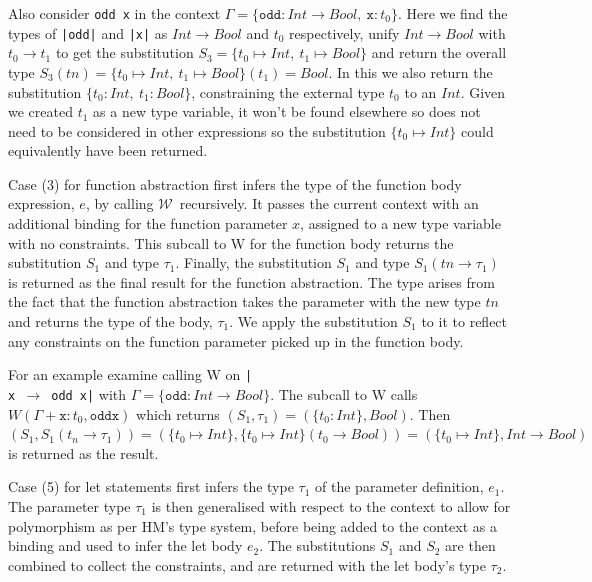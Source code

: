 \documentclass[a4paper,fleqn,oneside,12pt]{report}
\newcommand{\W}{$\mathcal{W}$}
\begin{document}
Also consider \texttt{odd x} in the context $\Gamma = \{ \mathtt{odd} : Int \rightarrow Bool,\ \mathtt{x} : t_0 \}$. Here we find the types of \texttt{|odd|} and \texttt{|x|} as $Int \rightarrow Bool$ and $t_0$ respectively, unify $Int \rightarrow Bool$ with $t_0 \rightarrow t_1$ to get the substitution $S_3 = \{ t_0 \mapsto Int,\ t_1 \mapsto Bool \}$ and return the overall type $S_3(tn) = \{ t_0 \mapsto Int,\ t_1 \mapsto Bool \}(t_1) = Bool$. In this we also return the substitution $\{ t_0: Int,\ t_1: Bool \}$, constraining the external type $t_0$ to an $Int$. Given we created $t_1$ as a new type variable, it won’t be found elsewhere so does not need to be considered in other expressions so the substitution $\{ t_0 \mapsto Int \}$ could equivalently have been returned.

Case (3) for function abstraction first infers the type of the function body expression, $e$, by calling \W\ recursively. It passes the current context with an additional binding for the function parameter $x$, assigned to a new type variable with no constraints. This subcall to W for the function body returns the substitution $S_1$ and type $\tau_1$. Finally, the substitution $S_1$ and type $S_1(tn \rightarrow \tau_1)$ is returned as the final result for the function abstraction. The type arises from the fact that the function abstraction takes the parameter with the new type $tn$ and returns the type of the body, $\tau_1$. We apply the substitution $S_1$ to it to reflect any constraints on the function parameter picked up in the function body.

For an example examine calling W on \texttt{|\\x $\rightarrow$ odd x|} with $\Gamma = \{ \mathtt{odd} : Int \rightarrow Bool \}$. The subcall to W calls $W(\Gamma + \mathtt{x} : t_0, \mathtt{odd x})$ which returns $(S_1, \tau_1) = (\{ t_0: Int \}, Bool)$. Then $(S_1, S_1(t_n \rightarrow \tau_1)) = (\{ t_0 \mapsto Int \}, \{ t_0 \mapsto Int \}(t_0 \rightarrow Bool)) = (\{ t_0 \mapsto Int \}, Int \rightarrow Bool)$ is returned as the result.

Case (5) for let statements first infers the type $\tau_1$ of the parameter definition, $e_1$. The parameter type $\tau_1$ is then generalised with respect to the context to allow for polymorphism as per HM’s type system, before being added to the context as a binding and used to infer the let body $e_2$. The substitutions $S_1$ and $S_2$ are then combined to collect the constraints, and are returned with the let body’s type $\tau_2$.
\end{document}
